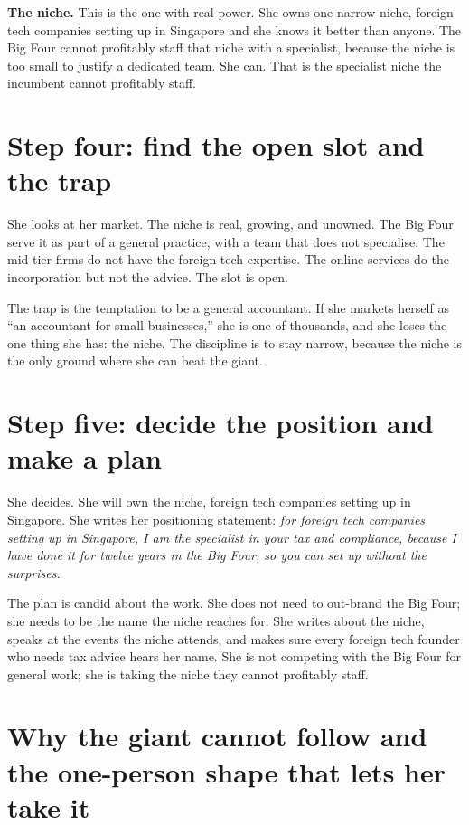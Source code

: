 \documentclass[10pt,twoside,openany]{memoir}
\newcommand{\needspacehead}{\needspace{4\baselineskip}}
\let\oldsection\section
\renewcommand{\section}{\needspacehead\oldsection}
\begin{document}
{\textbf{The niche.} This is the one with real power. She owns one narrow
niche, foreign tech companies setting up in Singapore and she knows it
better than anyone. The Big Four cannot profitably staff that niche with
a specialist, because the niche is too small to justify a dedicated
team. She can. That is the specialist niche the incumbent cannot
profitably staff.

\section{Step four: find the open slot and the
trap}\label{step-four-find-the-open-slot-and-the-trap-3}

She looks at her market. The niche is real, growing, and unowned. The
Big Four serve it as part of a general practice, with a team that does
not specialise. The mid-tier firms do not have the foreign-tech
expertise. The online services do the incorporation but not the advice.
The slot is open.

The trap is the temptation to be a general accountant. If she markets
herself as ``an accountant for small businesses,'' she is one of
thousands, and she loses the one thing she has: the niche. The
discipline is to stay narrow, because the niche is the only ground where
she can beat the giant.

\section{Step five: decide the position and make a
plan}\label{step-five-decide-the-position-and-make-a-plan-4}

She decides. She will own the niche, foreign tech companies setting up
in Singapore. She writes her positioning statement: \emph{for foreign
tech companies setting up in Singapore, I am the specialist in your tax
and compliance, because I have done it for twelve years in the Big Four,
so you can set up without the surprises.}

The plan is candid about the work. She does not need to out-brand the
Big Four; she needs to be the name the niche reaches for. She writes
about the niche, speaks at the events the niche attends, and makes sure
every foreign tech founder who needs tax advice hears her name. She is
not competing with the Big Four for general work; she is taking the
niche they cannot profitably staff.

\section{Why the giant cannot follow and the one-person shape that lets
her take
it}\label{why-the-giant-cannot-follow-and-the-one-person-shape-that-lets-her-take-it}

}
\end{document}

